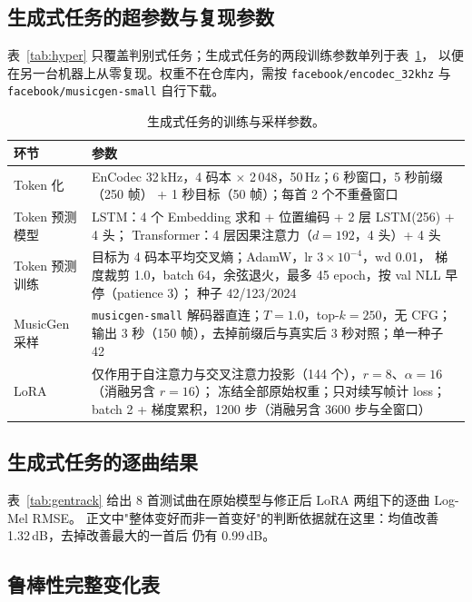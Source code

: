 \documentclass[UTF8,10pt,a4paper]{ctexart}
\begin{document}
\subsection{生成式任务的超参数与复现参数}\label{sec:appendix-gen}

表~\ref{tab:hyper} 只覆盖判别式任务；生成式任务的两段训练参数单列于表~\ref{tab:hyper-gen}，
以便在另一台机器上从零复现。权重不在仓库内，需按 \texttt{facebook/encodec\_32khz} 与
\texttt{facebook/musicgen-small} 自行下载。

\begin{table}[H]
\centering\small
\caption{生成式任务的训练与采样参数。}
\label{tab:hyper-gen}
\begin{tabular}{l p{9.5cm}}
\toprule
环节 & 参数\\
\midrule
Token 化 & EnCodec 32\,kHz，4 码本 $\times$ 2\,048，50\,Hz；6 秒窗口，5 秒前缀（250 帧）
+ 1 秒目标（50 帧）；每首 2 个不重叠窗口\\
Token 预测模型 & LSTM：4 个 Embedding 求和 + 位置编码 + 2 层 LSTM(256) + 4 头；
Transformer：4 层因果注意力（$d=192$，4 头）+ 4 头\\
Token 预测训练 & 目标为 4 码本平均交叉熵；AdamW，lr $3\times10^{-4}$，wd 0.01，
梯度裁剪 1.0，batch 64，余弦退火，最多 45 epoch，按 val NLL 早停（patience 3）；
种子 42/123/2024\\
MusicGen 采样 & \texttt{musicgen-small} 解码器直连；$T=1.0$，top-$k=250$，无 CFG；
输出 3 秒（150 帧），去掉前缀后与真实后 3 秒对照；单一种子 42\\
LoRA & 仅作用于自注意力与交叉注意力投影（144 个），$r=8$、$\alpha=16$（消融另含 $r=16$）；
冻结全部原始权重；只对续写帧计 loss；batch 2 + 梯度累积，1200 步（消融另含 3600 步与全窗口）\\
\bottomrule
\end{tabular}
\end{table}

\subsection{生成式任务的逐曲结果}\label{sec:gentrack}

表~\ref{tab:gentrack} 给出 8 首测试曲在原始模型与修正后 LoRA 两组下的逐曲 Log-Mel RMSE。
正文中"整体变好而非一首变好"的判断依据就在这里：均值改善 1.32\,dB，去掉改善最大的一首后
仍有 0.99\,dB。



\subsection{鲁棒性完整变化表}
\end{document}
